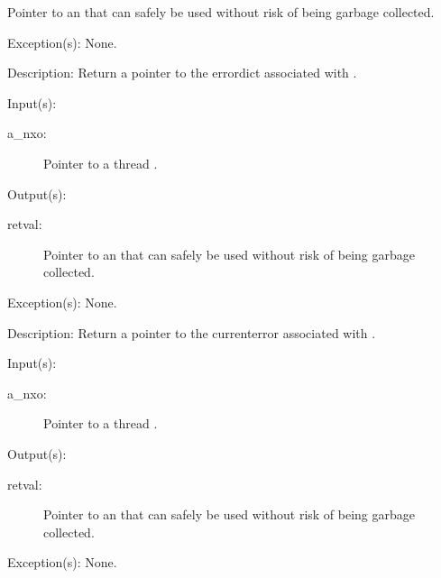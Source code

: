 \begin{capi}
\begin{capilist}
\begin{description}
			Pointer to an  that can safely be used
			without risk of being garbage collected.
		\end{description}
	\item[Exception(s): ] None.
	\item[Description: ]
		Return a pointer to the errordict associated with .
	\end{capilist}
\label{nxo_thread_currenterror_get}
	\begin{capilist}
	\item[Input(s): ]
		\begin{description}\item[]
		\item[a\_nxo: ]
			Pointer to a thread .
		\end{description}
	\item[Output(s): ]
		\begin{description}\item[]
		\item[retval: ]
			Pointer to an  that can safely be used
			without risk of being garbage collected.
		\end{description}
	\item[Exception(s): ] None.
	\item[Description: ]
		Return a pointer to the currenterror associated with
		.
	\end{capilist}
\label{nxo_thread_ostack_get}
	\begin{capilist}
	\item[Input(s): ]
		\begin{description}\item[]
		\item[a\_nxo: ]
			Pointer to a thread \classname{nxo}.
		\end{description}
	\item[Output(s): ]
		\begin{description}\item[]
		\item[retval: ]
			Pointer to an  that can safely be used
			without risk of being garbage collected.
		\end{description}
	\item[Exception(s): ] None.

\end{capilist}
\end{capi}
